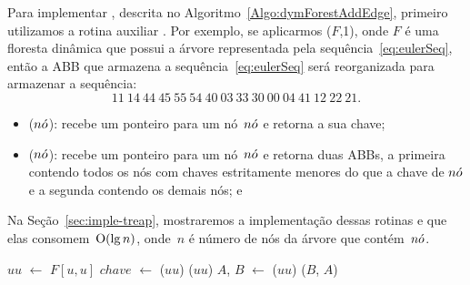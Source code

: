 Para implementar \dymForestAddEdge{}, descrita no Algoritmo~\ref{Algo:dymForestAddEdge}, primeiro utilizamos a rotina auxiliar \ETmovetofront{}.
Por exemplo, se aplicarmos \ETmovetofront($F$,1), onde $F$ é uma floresta dinâmica que possui a árvore representada pela sequência~\eqref{eq:eulerSeq}, então a ABB que armazena a sequência~\eqref{eq:eulerSeq} será reorganizada para armazenar a sequência:
\begin{equation}
11~14~44~45~55~54~40~03~33~30~00~04~41~12~22~21.\nonumber
\end{equation}
\begin{itemize}
\item \treapOrder($n\acute{o}$): recebe um ponteiro para um nó~$n\acute{o}$ e retorna a sua chave;
\item \treapSplit($n\acute{o}$): recebe um ponteiro para um nó~$n\acute{o}$ e retorna duas ABBs, a primeira contendo todos os nós com chaves estritamente menores do que a chave de $n\acute{o}$ e a segunda contendo os demais nós; e
\end{itemize}

Na Seção~\ref{sec:imple-treap}, mostraremos a implementação dessas rotinas e que elas consomem~$\mathrm{O}(\lg n)$, onde~$n$ é número de nós da árvore que contém~$n\acute{o}$.


\begin{algorithm}[htb]
\caption{\ETmovetofront($F$, $u$)}
\label{Algo:ETmovetofront}
\begin{algorithmic}[1]
\State $uu$ $\gets$ $F[u,u]$
\State $chave$ $\gets$ \treapOrder($uu$)
\label{algo:move:if}
\State \Return  \treapGetRoot($uu$)
\EndIf
\State $A$, $B$ $\gets$ \treapSplit($uu$)
\State \Return \treapJoin($B$, $A$)
\end{algorithmic}
\end{algorithm}


